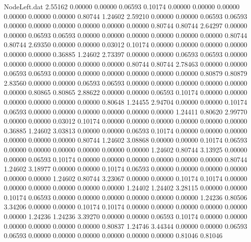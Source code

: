\begin{filecontents}{NodeLeft.dat}
   2.55162    0.00000    0.00000     0.06593    0.10174    0.00000    0.00000    0.00000    0.00000    0.00000    0.00000    0.80744    1.24602
   2.59210    0.00000    0.00000     0.06593    0.06593    0.00000    0.00000    0.00000    0.00000    0.00000    0.00000    0.80744    0.80744
   2.64297    0.00000    0.00000     0.06593    0.06593    0.00000    0.00000    0.00000    0.00000    0.00000    0.00000    0.80744    0.80744
   2.69350    0.00000    0.00000     0.03012    0.10174    0.00000    0.00000    0.00000    0.00000    0.00000    0.00000    0.36885    1.24602
   2.73397    0.00000    0.00000     0.06593    0.06593    0.00000    0.00000    0.00000    0.00000    0.00000    0.00000    0.80744    0.80744
   2.78463    0.00000    0.00000     0.06593    0.06593    0.00000    0.00000    0.00000    0.00000    0.00000    0.00000    0.80879    0.80879
   2.83560    0.00000    0.00000     0.06593    0.06593    0.00000    0.00000    0.00000    0.00000    0.00000    0.00000    0.80865    0.80865
   2.88622    0.00000    0.00000     0.06593    0.10174    0.00000    0.00000    0.00000    0.00000    0.00000    0.00000    0.80648    1.24455
   2.94704    0.00000    0.00000     0.10174    0.06593    0.00000    0.00000    0.00000    0.00000    0.00000    0.00000    1.24411    0.80620
   2.99770    0.00000    0.00000     0.03012    0.10174    0.00000    0.00000    0.00000    0.00000    0.00000    0.00000    0.36885    1.24602
   3.03813    0.00000    0.00000     0.06593    0.10174    0.00000    0.00000    0.00000    0.00000    0.00000    0.00000    0.80744    1.24602
   3.08868    0.00000    0.00000     0.10174    0.06593    0.00000    0.00000    0.00000    0.00000    0.00000    0.00000    1.24602    0.80744
   3.13925    0.00000    0.00000     0.06593    0.10174    0.00000    0.00000    0.00000    0.00000    0.00000    0.00000    0.80744    1.24602
   3.18977    0.00000    0.00000     0.10174    0.06593    0.00000    0.00000    0.00000    0.00000    0.00000    0.00000    1.24602    0.80744
   3.23067    0.00000    0.00000     0.10174    0.10174    0.00000    0.00000    0.00000    0.00000    0.00000    0.00000    1.24402    1.24402
   3.28115    0.00000    0.00000     0.10174    0.06593    0.00000    0.00000    0.00000    0.00000    0.00000    0.00000    1.24236    0.80506
   3.34206    0.00000    0.00000     0.10174    0.10174    0.00000    0.00000    0.00000    0.00000    0.00000    0.00000    1.24236    1.24236
   3.39270    0.00000    0.00000     0.06593    0.10174    0.00000    0.00000    0.00000    0.00000    0.00000    0.00000    0.80837    1.24746
   3.44344    0.00000    0.00000     0.06593    0.06593    0.00000    0.00000    0.00000    0.00000    0.00000    0.00000    0.81046    0.81046

\end{filecontents}
